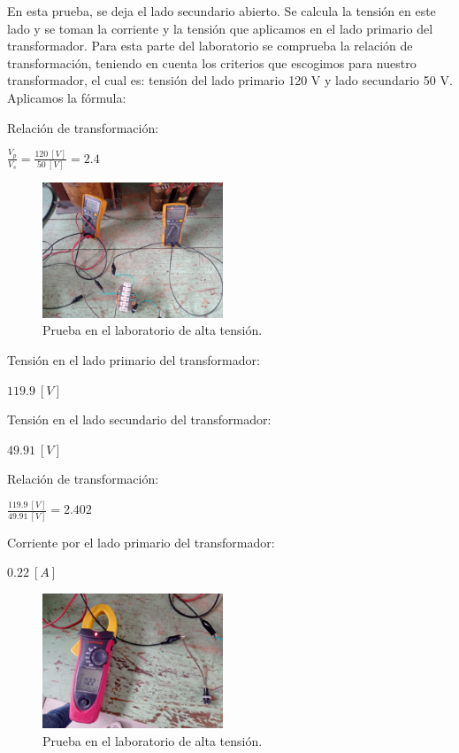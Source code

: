 En esta prueba, se deja el lado secundario abierto. Se calcula la tensión en este lado y se toman la corriente y la tensión que aplicamos en el lado primario del transformador. Para esta parte del laboratorio se comprueba la relación de transformación, teniendo en cuenta los criterios que escogimos para nuestro transformador, el cual es: tensión del lado primario 120 V y lado secundario 50 V. Aplicamos la fórmula:

Relación de transformación:
\begin{center}
    $\frac{V_p}{V_s} = \frac{120\ [V]}{50\ [V]} = 2.4$
\end{center}


\begin{figure}[ht!]
    \centering
    \includegraphics[width=0.48\textwidth]{fot/TP3.jpeg}
    \caption{Prueba en el laboratorio de alta tensión.}
    \label{fig:TP3}
\end{figure}
 
Tensión en el lado primario del transformador:
\begin{center}
    $119.9\ [V]$
\end{center}
Tensión en el lado secundario del transformador: 
\begin{center}
    $49.91\ [V]$
\end{center}
Relación de transformación: 
\begin{center}
    $ \frac{119.9\ [V]}{49.91\ [V]} = 2.402$
\end{center}
Corriente por el lado primario del transformador: 
\begin{center}
    $0.22\ [A]$
\end{center}
\begin{figure}[ht!]
    \centering
    \includegraphics[width=0.48\textwidth]{fot/TP2.jpeg}
    \caption{Prueba en el laboratorio de alta tensión.}
    \label{fig:TP2}
\end{figure}


